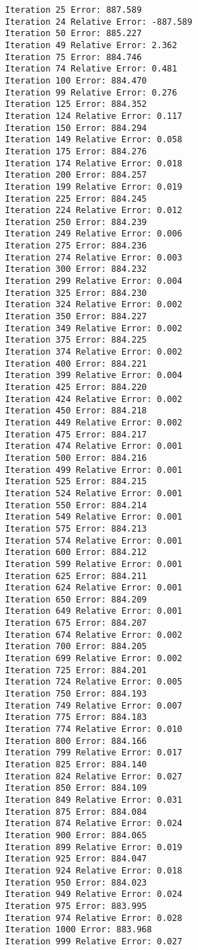 \documentclass[11pt]{article}
\begin{document}
    \begin{Verbatim}[commandchars=\\\{\}]
Iteration 25 Error: 887.589
Iteration 24 Relative Error: -887.589
Iteration 50 Error: 885.227
Iteration 49 Relative Error: 2.362
Iteration 75 Error: 884.746
Iteration 74 Relative Error: 0.481
Iteration 100 Error: 884.470
Iteration 99 Relative Error: 0.276
Iteration 125 Error: 884.352
Iteration 124 Relative Error: 0.117
Iteration 150 Error: 884.294
Iteration 149 Relative Error: 0.058
Iteration 175 Error: 884.276
Iteration 174 Relative Error: 0.018
Iteration 200 Error: 884.257
Iteration 199 Relative Error: 0.019
Iteration 225 Error: 884.245
Iteration 224 Relative Error: 0.012
Iteration 250 Error: 884.239
Iteration 249 Relative Error: 0.006
Iteration 275 Error: 884.236
Iteration 274 Relative Error: 0.003
Iteration 300 Error: 884.232
Iteration 299 Relative Error: 0.004
Iteration 325 Error: 884.230
Iteration 324 Relative Error: 0.002
Iteration 350 Error: 884.227
Iteration 349 Relative Error: 0.002
Iteration 375 Error: 884.225
Iteration 374 Relative Error: 0.002
Iteration 400 Error: 884.221
Iteration 399 Relative Error: 0.004
Iteration 425 Error: 884.220
Iteration 424 Relative Error: 0.002
Iteration 450 Error: 884.218
Iteration 449 Relative Error: 0.002
Iteration 475 Error: 884.217
Iteration 474 Relative Error: 0.001
Iteration 500 Error: 884.216
Iteration 499 Relative Error: 0.001
Iteration 525 Error: 884.215
Iteration 524 Relative Error: 0.001
Iteration 550 Error: 884.214
Iteration 549 Relative Error: 0.001
Iteration 575 Error: 884.213
Iteration 574 Relative Error: 0.001
Iteration 600 Error: 884.212
Iteration 599 Relative Error: 0.001
Iteration 625 Error: 884.211
Iteration 624 Relative Error: 0.001
Iteration 650 Error: 884.209
Iteration 649 Relative Error: 0.001
Iteration 675 Error: 884.207
Iteration 674 Relative Error: 0.002
Iteration 700 Error: 884.205
Iteration 699 Relative Error: 0.002
Iteration 725 Error: 884.201
Iteration 724 Relative Error: 0.005
Iteration 750 Error: 884.193
Iteration 749 Relative Error: 0.007
Iteration 775 Error: 884.183
Iteration 774 Relative Error: 0.010
Iteration 800 Error: 884.166
Iteration 799 Relative Error: 0.017
Iteration 825 Error: 884.140
Iteration 824 Relative Error: 0.027
Iteration 850 Error: 884.109
Iteration 849 Relative Error: 0.031
Iteration 875 Error: 884.084
Iteration 874 Relative Error: 0.024
Iteration 900 Error: 884.065
Iteration 899 Relative Error: 0.019
Iteration 925 Error: 884.047
Iteration 924 Relative Error: 0.018
Iteration 950 Error: 884.023
Iteration 949 Relative Error: 0.024
Iteration 975 Error: 883.995
Iteration 974 Relative Error: 0.028
Iteration 1000 Error: 883.968
Iteration 999 Relative Error: 0.027

    \end{Verbatim}
\end{document}
